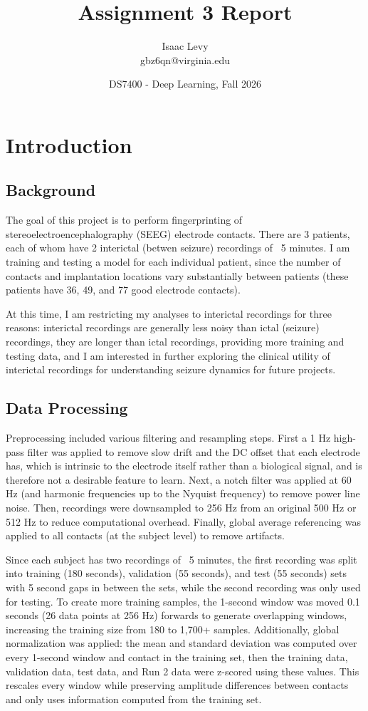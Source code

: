 \documentclass{article}
\title{Assignment 3 Report}
\author{
Isaac Levy \\
gbz6qn@virginia.edu}
\date{DS7400 - Deep Learning, Fall 2026}
\begin{document}
\maketitle
\section{Introduction}
\subsection{Background}
The goal of this project is to perform fingerprinting of stereoelectroencephalography (SEEG) electrode contacts. 
There are 3 patients, each of whom have 2 interictal (betwen seizure) recordings of ~5 minutes. 
I am training and testing a model for each individual patient, since the number of contacts and implantation
locations vary substantially between patients (these patients have 36, 49, and 77 good electrode contacts).

At this time, I am restricting my analyses to interictal recordings for three reasons: interictal recordings are generally less noisy than ictal (seizure) recordings, they are longer than ictal recordings, providing more training and testing data, and I am interested in further exploring the clinical utility of interictal recordings for understanding seizure dynamics for future projects.

\subsection{Data Processing}
Preprocessing included various filtering and resampling steps. First a 1 Hz high-pass filter was applied to remove slow drift and the DC offset that each electrode has, which is intrinsic to the electrode itself rather than a biological signal, and is therefore not a desirable feature to learn. Next, a notch filter was applied at 60 Hz (and harmonic frequencies up to the Nyquist frequency) to remove power line noise. Then, recordings were downsampled to 256 Hz from an original 500 Hz or 512 Hz to reduce computational overhead. Finally, global average referencing was applied to all contacts (at the subject level) to remove artifacts.

Since each subject has two recordings of ~5 minutes, the first recording was split into training (180 seconds), validation (55 seconds), and test (55 seconds) sets with 5 second gaps in between the sets, while the second recording was only used for testing. To create more training samples, the 1-second window was moved 0.1 seconds (26 data points at 256 Hz) forwards to generate overlapping windows, increasing the training size from 180 to 1,700+ samples. Additionally, global normalization was applied: the mean and standard deviation was computed over every 1-second window and contact in the training set, then the training data, validation data, test data, and Run 2 data were z-scored using these values. This rescales every window while preserving amplitude differences between contacts and only uses information computed
from the training set.
\end{document}
